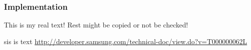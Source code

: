 \subsubsection{Implementation} \label{subsection:license-samsung-implementation}
This is my real text! Rest might be copied or not be checked!


sis is text
\url{http://developer.samsung.com/technical-doc/view.do?v=T000000062L}




